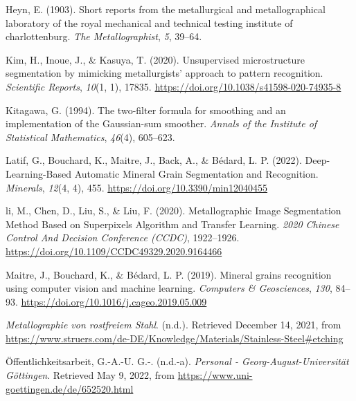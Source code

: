 \documentclass[
  12pt,
]{book}
\newlength{\cslhangindent}
\newlength{\cslentryspacingunit} %
\newenvironment{CSLReferences}[2] %
 {%
  \setlength{\parindent}{0pt}
  \ifodd #1
  \let\oldpar\par
  \def\par{\hangindent=\cslhangindent\oldpar}
  \fi
  \setlength{\parskip}{#2\cslentryspacingunit}
 }%
 {}
\begin{document}
\begin{CSLReferences}{1}{0}
\leavevmode{}%
Heyn, E. (1903). Short reports from the metallurgical and metallographical laboratory of the royal mechanical and technical testing institute of charlottenburg. \emph{The Metallographist}, \emph{5}, 39--64.

\leavevmode{}%
Kim, H., Inoue, J., \& Kasuya, T. (2020). Unsupervised microstructure segmentation by mimicking metallurgists' approach to pattern recognition. \emph{Scientific Reports}, \emph{10}(1, 1), 17835. \url{https://doi.org/10.1038/s41598-020-74935-8}

\leavevmode{}%
Kitagawa, G. (1994). The two-filter formula for smoothing and an implementation of the {Gaussian-sum} smoother. \emph{Annals of the Institute of Statistical Mathematics}, \emph{46}(4), 605--623.

\leavevmode{}%
Latif, G., Bouchard, K., Maitre, J., Back, A., \& Bédard, L. P. (2022). Deep-{Learning-Based Automatic Mineral Grain Segmentation} and {Recognition}. \emph{Minerals}, \emph{12}(4, 4), 455. \url{https://doi.org/10.3390/min12040455}

\leavevmode{}%
li, M., Chen, D., Liu, S., \& Liu, F. (2020). Metallographic {Image Segmentation Method Based} on {Superpixels Algorithm} and {Transfer Learning}. \emph{2020 {Chinese Control And Decision Conference} ({CCDC})}, 1922--1926. \url{https://doi.org/10.1109/CCDC49329.2020.9164466}

\leavevmode{}%
Maitre, J., Bouchard, K., \& Bédard, L. P. (2019). Mineral grains recognition using computer vision and machine learning. \emph{Computers \& Geosciences}, \emph{130}, 84--93. \url{https://doi.org/10.1016/j.cageo.2019.05.009}

\leavevmode{}%
\emph{Metallographie von rostfreiem {Stahl}}. (n.d.). Retrieved December 14, 2021, from \url{https://www.struers.com/de-DE/Knowledge/Materials/Stainless-Steel\#etching}

\leavevmode{}%
Öffentlichkeitsarbeit, G.-A.-U. G.-. (n.d.-a). \emph{Personal - Georg-August-Universität Göttingen}. Retrieved May 9, 2022, from \url{https://www.uni-goettingen.de/de/652520.html}


\end{CSLReferences}
\end{document}
